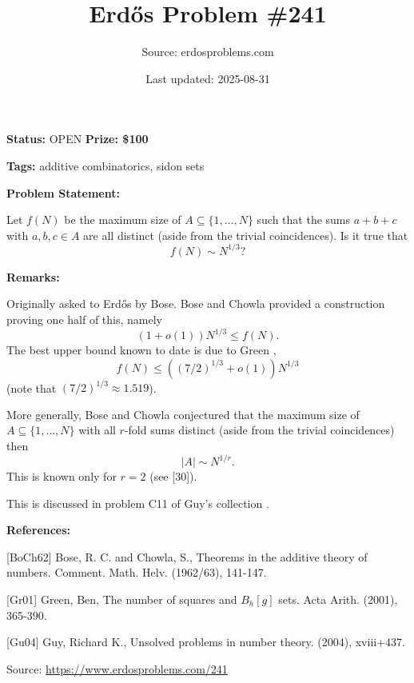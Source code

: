 \documentclass{article}
\title{Erd\H{o}s Problem \#241}
\date{Last updated: 2025-08-31}
\author{Source: erdosproblems.com}
\begin{document}
\maketitle

\noindent\textbf{Status:} OPEN \quad \textbf{Prize: \$100}

\noindent\textbf{Tags:} additive combinatorics, sidon sets

\medskip
\noindent\textbf{Problem Statement:}

Let $f(N)$ be the maximum size of $A\subseteq \{1,\ldots,N\}$ such that the sums $a+b+c$ with $a,b,c\in A$ are all distinct (aside from the trivial coincidences). Is it true that\[ f(N)\sim N^{1/3}?\]

\bigskip
\noindent\textbf{Remarks:}

Originally asked to Erd\H{o}s by Bose. Bose and Chowla \cite{BoCh62} provided a construction proving one half of this, namely\[(1+o(1))N^{1/3}\leq f(N).\]The best upper bound known to date is due to Green \cite{Gr01},\[f(N) \leq ((7/2)^{1/3}+o(1))N^{1/3}\](note that $(7/2)^{1/3}\approx 1.519$). 

More generally, Bose and Chowla conjectured that the maximum size of $A\subseteq \{1,\ldots,N\}$ with all $r$-fold sums distinct (aside from the trivial coincidences) then\[\lvert A\rvert \sim N^{1/r}.\]This is known only for $r=2$ (see [30]).

This is discussed in problem C11 of Guy's collection \cite{Gu04}.

\bigskip
\noindent\textbf{References:}

[BoCh62] Bose, R. C. and Chowla, S., Theorems in the additive theory of numbers. Comment. Math. Helv. (1962/63), 141-147.
 
 [Gr01] Green, Ben, The number of squares and {$B_h[g]$} sets. Acta Arith. (2001), 365-390.
 
 [Gu04] Guy, Richard K., Unsolved problems in number theory. (2004), xviii+437.

\bigskip
\noindent\small{Source: \url{https://www.erdosproblems.com/241}}
\end{document}
